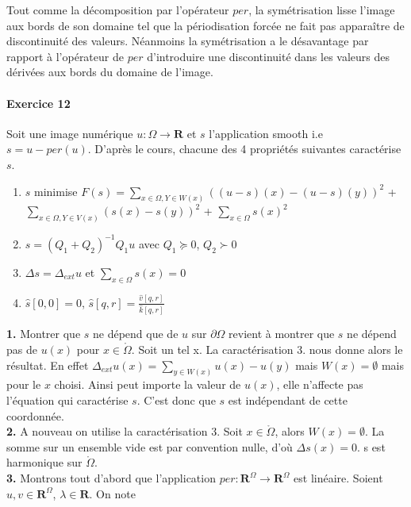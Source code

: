 \documentclass[a4paper, 11pt]{article}
\begin{document}
Tout comme la décomposition par l'opérateur $per$, la symétrisation lisse l'image aux bords de son domaine tel que la
périodisation forcée ne fait pas apparaître de discontinuité des valeurs. Néanmoins la symétrisation a le désavantage
par rapport à l'opérateur de $per$ d'introduire une discontinuité dans les valeurs des dérivées aux bords du domaine de
l'image.

\clearpage

\paragraph{Exercice 12}

Soit une image numérique $u: \Omega \to \mathbf{R}$ et $s$ l'application \og smooth \fg i.e $s=u - per(u)$. D'après le cours,
chacune des 4 propriétés suivantes caractérise $s$. 

\begin{enumerate}
  \item $s$ minimise $\displaystyle F(s) = \sum_{x \in \Omega, Y \in W(x)} \left( (u-s)(x) - (u-s)(y) \right)^2$ +
  $\displaystyle \sum_{x \in \Omega, Y \in V(x)} \left( s(x) - s(y) \right)^2$  + $\displaystyle \sum_{x \in \Omega} s(x)^2$
  \item $s = (Q_1 + Q_2)^{-1}Q_1u$ avec $Q_1 \succeq 0$,  $Q_2 \succ 0$
  \item $\Delta s = \Delta_{ext}u$ et $\displaystyle \sum_{x \in \Omega} s(x) = 0$
  \item $\hat{s}[0, 0] = 0$, $\hat{s}[q, r] = \frac{\hat{v}[q, r]}{\hat{k}[q, r]}$
\end{enumerate}

\textbf{1.} Montrer que $s$ ne dépend que de $u$ sur $\partial \Omega$ revient à montrer que $s$ ne dépend pas de $u(x)$
pour $x \in \mathring{\Omega}$. Soit un tel x. La caractérisation 3. nous donne alors le résultat. En effet $\Delta_{ext} 
u(x) = \sum_{y \in W(x)} u(x)-u(y)$ mais $W(x) = \emptyset$ mais pour le $x$ choisi. Ainsi peut importe la valeur de
$u(x)$, elle n'affecte pas l'équation qui caractérise $s$. C'est donc que $s$ est indépendant de cette coordonnée. \\

\textbf{2.} A nouveau on utilise la caractérisation 3. Soit $x \in \mathring{\Omega}$, alors $W(x) = \emptyset$. La
somme sur un ensemble vide est par convention nulle, d'où $\Delta s(x) = 0$. s est harmonique sur $\mathring{\Omega}$.\\

\textbf{3.} Montrons tout d'abord que l'application $per : \mathbf{R}^{\Omega} \to \mathbf{R}^{\Omega}$ est linéaire.
Soient $u, v \in \mathbf{R}^{\Omega}$, $\lambda \in \mathbf{R}$. On note
\end{document}

